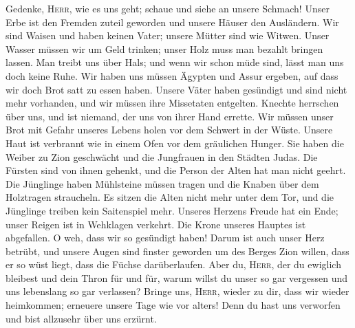  Gedenke, \textsc{Herr}, wie es uns geht; schaue und siehe
an unsere Schmach!  Unser Erbe ist den Fremden zuteil
geworden und unsere Häuser den Ausländern.  Wir sind
Waisen und haben keinen Vater; unsere Mütter sind wie Witwen.
 Unser Wasser müssen wir um Geld trinken; unser Holz muss
man bezahlt bringen lassen.  Man treibt uns über Hals; und
wenn wir schon müde sind, lässt man uns doch keine Ruhe. 
Wir haben uns müssen Ägypten und Assur ergeben, auf dass wir doch Brot
satt zu essen haben.  Unsere Väter haben gesündigt und
sind nicht mehr vorhanden, und wir müssen ihre Missetaten entgelten.
 Knechte herrschen über uns, und ist niemand, der uns von
ihrer Hand errette.  Wir müssen unser Brot mit Gefahr
unseres Lebens holen vor dem Schwert in der Wüste. 
Unsere Haut ist verbrannt wie in einem Ofen vor dem gräulichen Hunger.
 Sie haben die Weiber zu Zion geschwächt und die
Jungfrauen in den Städten Judas.  Die Fürsten sind von
ihnen gehenkt, und die Person der Alten hat man nicht geehrt.
 Die Jünglinge haben Mühlsteine müssen tragen und die
Knaben über dem Holztragen straucheln.  Es sitzen die
Alten nicht mehr unter dem Tor, und die Jünglinge treiben kein
Saitenspiel mehr.  Unseres Herzens Freude hat ein Ende;
unser Reigen ist in Wehklagen verkehrt.  Die Krone
unseres Hauptes ist abgefallen. O weh, dass wir so gesündigt haben!
 Darum ist auch unser Herz betrübt, und unsere Augen sind
finster geworden  um des Berges Zion willen, dass er so
wüst liegt, dass die Füchse darüberlaufen.  Aber du,
\textsc{Herr}, der du ewiglich bleibest und dein Thron für und für,
 warum willst du unser so gar vergessen und uns
lebenslang so gar verlassen?  Bringe uns, \textsc{Herr},
wieder zu dir, dass wir wieder heimkommen; erneuere unsere Tage wie vor
alters!  Denn du hast uns verworfen und bist allzusehr
über uns erzürnt.
